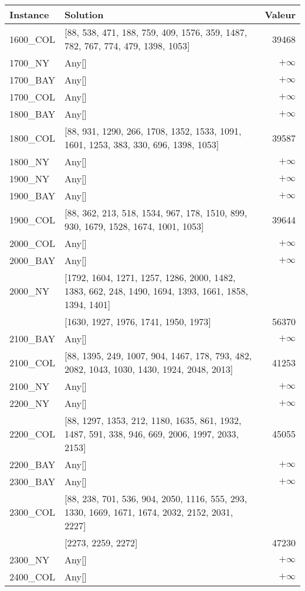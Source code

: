 \documentclass[main.tex]{subfiles}
\begin{document}
\begin{center}
\renewcommand{\arraystretch}{1.4} 
\begin{tabular}{llr}\hline
\textbf{Instance} & \textbf{Solution} & \textbf{Valeur} \\\hline

1600\_COL & [88, 538, 471, 188, 759, 409, 1576, 359, 1487, 782, 767, 774, 479, 1398, 1053] & 39468\\
1700\_NY & Any[] & $+\infty$\\
1700\_BAY & Any[] & $+\infty$\\
1700\_COL & Any[] & $+\infty$\\
1800\_BAY & Any[] & $+\infty$\\
1800\_COL & [88, 931, 1290, 266, 1708, 1352, 1533, 1091, 1601, 1253, 383, 330, 696, 1398, 1053] & 39587\\
1800\_NY & Any[] & $+\infty$\\
1900\_NY & Any[] & $+\infty$\\
1900\_BAY & Any[] & $+\infty$\\
1900\_COL & [88, 362, 213, 518, 1534, 967, 178, 1510, 899, 930, 1679, 1528, 1674, 1001, 1053] & 39644\\
2000\_COL & Any[] & $+\infty$\\
2000\_BAY & Any[] & $+\infty$\\
2000\_NY & [1792, 1604, 1271, 1257, 1286, 2000, 1482, 1383, 662, 248, 1490, 1694, 1393, 1661, 1858, 1394, 1401]\\ & [1630, 1927, 1976, 1741, 1950, 1973] & 56370\\
2100\_BAY & Any[] & $+\infty$\\
2100\_COL & [88, 1395, 249, 1007, 904, 1467, 178, 793, 482, 2082, 1043, 1030, 1430, 1924, 2048, 2013] & 41253\\
2100\_NY & Any[] & $+\infty$\\
2200\_NY & Any[] & $+\infty$\\
2200\_COL & [88, 1297, 1353, 212, 1180, 1635, 861, 1932, 1487, 591, 338, 946, 669, 2006, 1997, 2033, 2153] & 45055\\
2200\_BAY & Any[] & $+\infty$\\
2300\_BAY & Any[] & $+\infty$\\
2300\_COL & [88, 238, 701, 536, 904, 2050, 1116, 555, 293, 1330, 1669, 1671, 1674, 2032, 2152, 2031, 2227]\\ & [2273, 2259, 2272] & 47230\\
2300\_NY & Any[] & $+\infty$\\
2400\_COL & Any[] & $+\infty$\\

\end{tabular}
\end{center}
\end{document}
